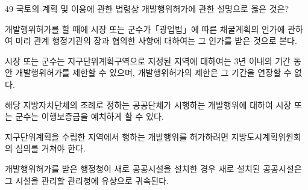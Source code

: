 \begin{question}{49}
국토의 계획 및 이용에 관한 법령상 개발행위허가에 관한 설명으로 옳은 것은?
\begin{choices}
  \item 개발행위허가를 할 때에 시장 또는 군수가「광업법」에 따른 채굴계획의 인가에 관하여 미리 관계 행정기관의 장과 협의한 사항에 대하여는 그 인가를 받은 것으로 본다.
  \item 시장 또는 군수는 지구단위계획구역으로 지정된 지역에 대하여는 3년 이내의 기간 동안 개발행위허가를 제한할 수 있으며, 개발행위허가의 제한은 그 기간을 연장할 수 없다.
  \item 해당 지방자치단체의 조례로 정하는 공공단체가 시행하는 개발행위에 대하여 시장 또는 군수는 이행보증금을 예치하게 할 수 있다.
  \item 지구단위계획을 수립한 지역에서 행하는 개발행위를 허가하려면 지방도시계획위원회의 심의를 거쳐야 한다.
  \item 개발행위허가를 받은 행정청이 새로 공공시설을 설치한 경우 새로 설치된 공공시설은 그 시설을 관리할 관리청에 유상으로 귀속된다.
\end{choices}
\end{question}
